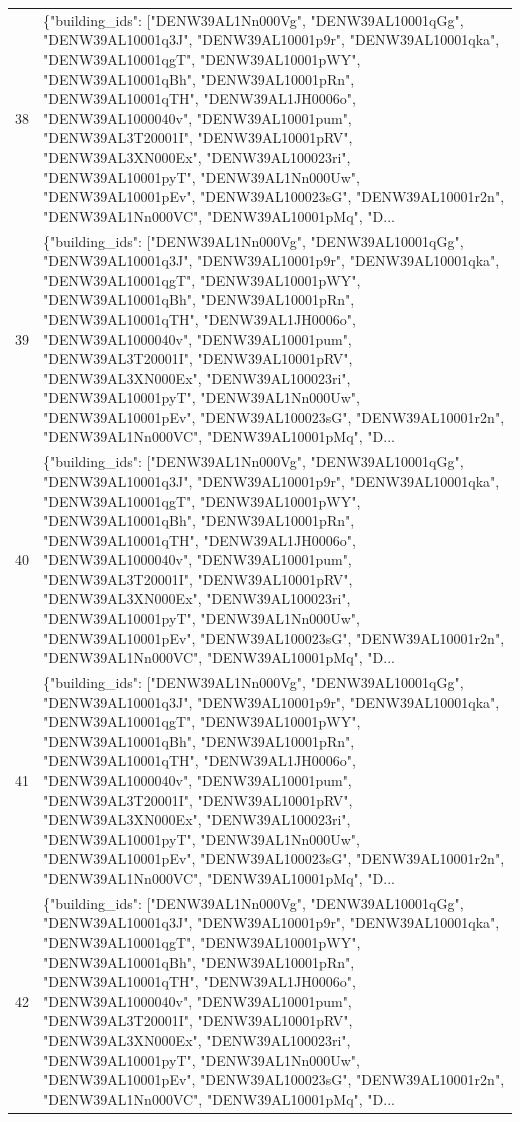 \documentclass[a4paper,11pt]{article}
\begin{document}
\begin{table}[ht]
\begin{tabular}{r p{12cm}}
38 & \{"building\_ids": ["DENW39AL1Nn000Vg", "DENW39AL10001qGg", "DENW39AL10001q3J", "DENW39AL10001p9r", "DENW39AL10001qka", "DENW39AL10001qgT", "DENW39AL10001pWY", "DENW39AL10001qBh", "DENW39AL10001pRn", "DENW39AL10001qTH", "DENW39AL1JH0006o", "DENW39AL1000040v", "DENW39AL10001pum", "DENW39AL3T20001I", "DENW39AL10001pRV", "DENW39AL3XN000Ex", "DENW39AL100023ri", "DENW39AL10001pyT", "DENW39AL1Nn000Uw", "DENW39AL10001pEv", "DENW39AL100023sG", "DENW39AL10001r2n", "DENW39AL1Nn000VC", "DENW39AL10001pMq", "D... \\
39 & \{"building\_ids": ["DENW39AL1Nn000Vg", "DENW39AL10001qGg", "DENW39AL10001q3J", "DENW39AL10001p9r", "DENW39AL10001qka", "DENW39AL10001qgT", "DENW39AL10001pWY", "DENW39AL10001qBh", "DENW39AL10001pRn", "DENW39AL10001qTH", "DENW39AL1JH0006o", "DENW39AL1000040v", "DENW39AL10001pum", "DENW39AL3T20001I", "DENW39AL10001pRV", "DENW39AL3XN000Ex", "DENW39AL100023ri", "DENW39AL10001pyT", "DENW39AL1Nn000Uw", "DENW39AL10001pEv", "DENW39AL100023sG", "DENW39AL10001r2n", "DENW39AL1Nn000VC", "DENW39AL10001pMq", "D... \\
40 & \{"building\_ids": ["DENW39AL1Nn000Vg", "DENW39AL10001qGg", "DENW39AL10001q3J", "DENW39AL10001p9r", "DENW39AL10001qka", "DENW39AL10001qgT", "DENW39AL10001pWY", "DENW39AL10001qBh", "DENW39AL10001pRn", "DENW39AL10001qTH", "DENW39AL1JH0006o", "DENW39AL1000040v", "DENW39AL10001pum", "DENW39AL3T20001I", "DENW39AL10001pRV", "DENW39AL3XN000Ex", "DENW39AL100023ri", "DENW39AL10001pyT", "DENW39AL1Nn000Uw", "DENW39AL10001pEv", "DENW39AL100023sG", "DENW39AL10001r2n", "DENW39AL1Nn000VC", "DENW39AL10001pMq", "D... \\
41 & \{"building\_ids": ["DENW39AL1Nn000Vg", "DENW39AL10001qGg", "DENW39AL10001q3J", "DENW39AL10001p9r", "DENW39AL10001qka", "DENW39AL10001qgT", "DENW39AL10001pWY", "DENW39AL10001qBh", "DENW39AL10001pRn", "DENW39AL10001qTH", "DENW39AL1JH0006o", "DENW39AL1000040v", "DENW39AL10001pum", "DENW39AL3T20001I", "DENW39AL10001pRV", "DENW39AL3XN000Ex", "DENW39AL100023ri", "DENW39AL10001pyT", "DENW39AL1Nn000Uw", "DENW39AL10001pEv", "DENW39AL100023sG", "DENW39AL10001r2n", "DENW39AL1Nn000VC", "DENW39AL10001pMq", "D... \\
42 & \{"building\_ids": ["DENW39AL1Nn000Vg", "DENW39AL10001qGg", "DENW39AL10001q3J", "DENW39AL10001p9r", "DENW39AL10001qka", "DENW39AL10001qgT", "DENW39AL10001pWY", "DENW39AL10001qBh", "DENW39AL10001pRn", "DENW39AL10001qTH", "DENW39AL1JH0006o", "DENW39AL1000040v", "DENW39AL10001pum", "DENW39AL3T20001I", "DENW39AL10001pRV", "DENW39AL3XN000Ex", "DENW39AL100023ri", "DENW39AL10001pyT", "DENW39AL1Nn000Uw", "DENW39AL10001pEv", "DENW39AL100023sG", "DENW39AL10001r2n", "DENW39AL1Nn000VC", "DENW39AL10001pMq", "D... \\

\end{tabular}
\end{table}
\end{document}
